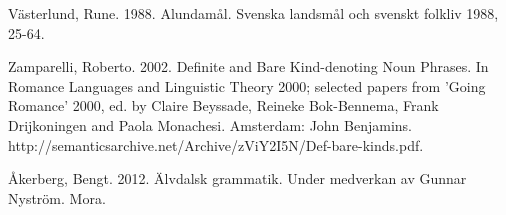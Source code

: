 \begin{styleBodytextC}
Västerlund, Rune. 1988. Alundamål. Svenska landsmål och svenskt folkliv 1988, 25-64.

\end{styleBodytextC}

\begin{styleBodytextC}
Zamparelli, Roberto. 2002. Definite and Bare Kind-denoting Noun Phrases. In Romance Languages and Linguistic Theory 2000; selected papers from 'Going Romance' 2000, ed. by Claire Beyssade, Reineke Bok-Bennema, Frank Drijkoningen and Paola Monachesi. Amsterdam: John Benjamins. http://semanticsarchive.net/Archive/zViY2I5N/Def-bare-kinds.pdf.

\end{styleBodytextC}

\begin{styleBodytextC}
Åkerberg, Bengt. 2012. Älvdalsk grammatik. Under medverkan av Gunnar Nyström. Mora. 

\end{styleBodytextC}

 
